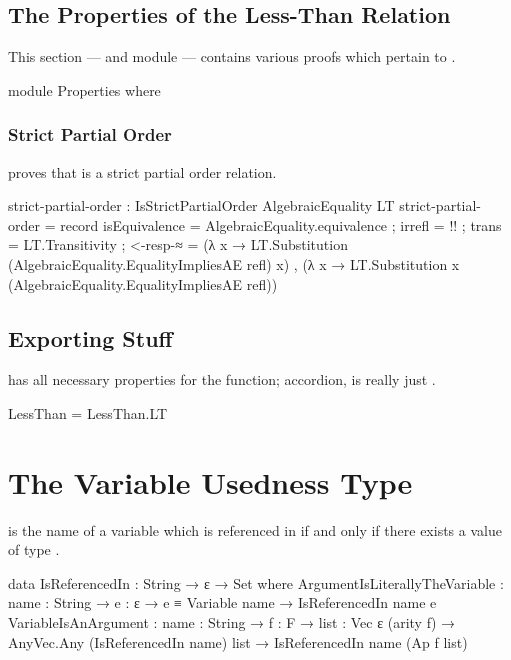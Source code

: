 \documentclass{report}
\begin{document}
\section{The Properties of the Less-Than Relation}
This section --- and module --- contains various proofs which pertain to .

\begin{code}
    module Properties where
\end{code}

\subsection{Strict Partial Order}
 proves that  is a strict partial order relation.

\begin{code}
      strict-partial-order : IsStrictPartialOrder AlgebraicEquality LT
      strict-partial-order = record
        { isEquivalence = AlgebraicEquality.equivalence
        ; irrefl = {!!}
        ; trans = LT.Transitivity
        ; <-resp-≈ = (λ x → LT.Substitution (AlgebraicEquality.EqualityImpliesAE refl) x)
                   , (λ x → LT.Substitution x (AlgebraicEquality.EqualityImpliesAE refl))
        }
\end{code}

\section{Exporting Stuff}
 has all necessary properties for the  function; accordion,  is really just .

\begin{code}
  LessThan = LessThan.LT
\end{code}

\chapter{The Variable Usedness Type}
 is the name of a variable which is referenced in  if and only if there exists a value of type   .

\begin{code}
  data IsReferencedIn : String → ε → Set where
    ArgumentIsLiterallyTheVariable :
      {name : String} →
      {e : ε} →
      e ≡ Variable name →
      IsReferencedIn name e
    VariableIsAnArgument :
      {name : String} →
      {f : F} →
      {list : Vec ε (arity f)} →
      AnyVec.Any (IsReferencedIn name) list →
      IsReferencedIn name (Ap f list)
\end{code}
\end{document}
